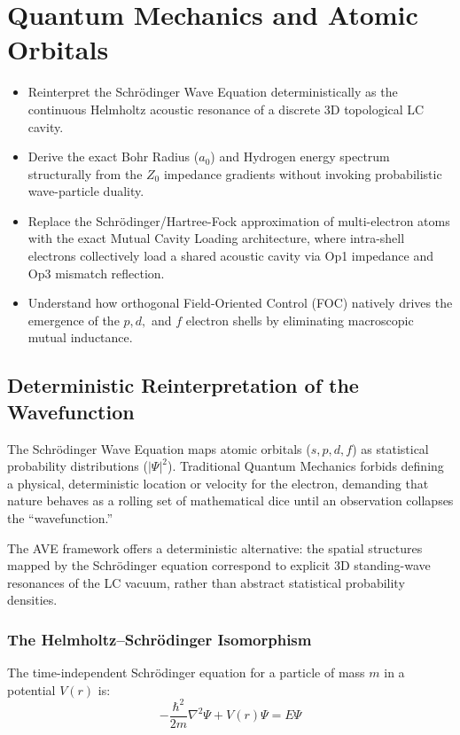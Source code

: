 \chapter{Quantum Mechanics and Atomic Orbitals}
\label{ch:quantum_orbitals}

\begin{objectivebox}
\begin{itemize}
    \item Reinterpret the Schrödinger Wave Equation deterministically as the continuous Helmholtz acoustic resonance of a discrete 3D topological LC cavity.
    \item Derive the exact Bohr Radius ($a_0$) and Hydrogen energy spectrum structurally from the $Z_0$ impedance gradients without invoking probabilistic wave-particle duality.
    \item Replace the Schrödinger/Hartree-Fock approximation of multi-electron atoms with the exact Mutual Cavity Loading architecture, where intra-shell electrons collectively load a shared acoustic cavity via Op1 impedance and Op3 mismatch reflection.
    \item Understand how orthogonal Field-Oriented Control (FOC) natively drives the emergence of the $p, d,$ and $f$ electron shells by eliminating macroscopic mutual inductance.
\end{itemize}
\end{objectivebox}

\section{Deterministic Reinterpretation of the Wavefunction}
The Schrödinger Wave Equation maps atomic orbitals ($s, p, d, f$) as statistical probability distributions ($|\Psi|^2$). Traditional Quantum Mechanics forbids defining a physical, deterministic location or velocity for the electron, demanding that nature behaves as a rolling set of mathematical dice until an observation collapses the ``wavefunction.''

The AVE framework offers a deterministic alternative: the spatial structures mapped by the Schr\"odinger equation correspond to explicit 3D standing-wave resonances of the LC vacuum, rather than abstract statistical probability densities.

\subsection{The Helmholtz--Schrödinger Isomorphism}
The time-independent Schrödinger equation for a particle of mass $m$ in a potential $V(r)$ is:
\begin{equation}
    -\frac{\hbar^2}{2m}\nabla^2 \Psi + V(r)\Psi = E\Psi
\end{equation}

